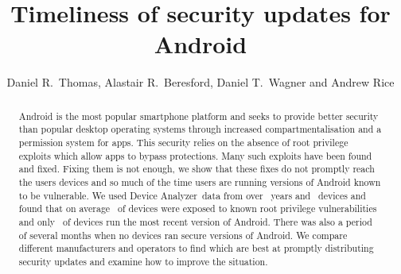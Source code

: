 \documentclass[conference,a4paper,twoside]{IEEEtran}
\author{Daniel R.\ Thomas, Alastair R.\ Beresford, Daniel T.\ Wagner and Andrew Rice}
\newcommand{\da}{Device Analyzer}
\begin{document}
\title{Timeliness of security updates for Android}


\author{
}




\maketitle


\begin{abstract}
Android is the most popular smartphone platform and seeks to provide better security than popular desktop operating systems through increased compartmentalisation and a permission system for apps.
This security relies on the absence of root privilege exploits which allow apps to bypass protections.
Many such exploits have been found and fixed.
Fixing them is not enough, we show that these fixes do not promptly reach the users devices and so much of the time users are running versions of Android known to be vulnerable.
We used \da\ data from over \daOSYearsOfData\ years and \daNumOSDevices\ devices and found that on average \daMeanInsecurityPerc\ of devices were exposed to known root privilege vulnerabilities and only \daUpdatednessPerc\ of devices run the most recent version of Android.
There was also a period of several months when no devices ran secure versions of Android.
We compare different manufacturers and operators to find which are best at promptly distributing security updates and examine how to improve the situation. %
\end{abstract}
\end{document}
